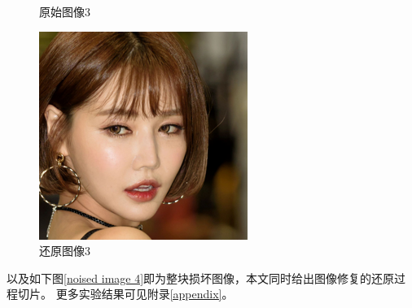 \begin{figure}[H]
\begin{minipage}[b]{0.3\linewidth}
    \caption{原始图像3}
    \label{original image 3}
  \end{minipage}
\hspace{0.1cm}
  \begin{minipage}[b]{0.3\linewidth}
    \includegraphics[width=\linewidth]{Picture/recon/00002.png}
    \caption{还原图像3}
    \label{inpainted image 3}
  \end{minipage}
\end{figure}
以及如下图\ref{noised image 4}即为整块损坏图像，本文同时给出图像修复的还原过程切片。 更多实验结果可见附录\ref{appendix}。 



